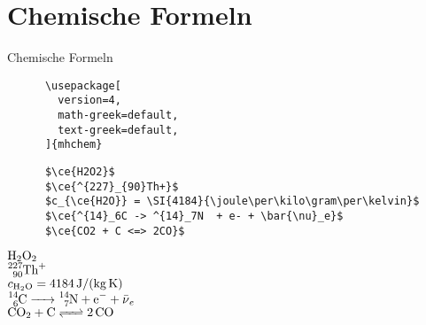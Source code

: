 \section{Chemische Formeln}
\begin{frame}[fragile]{Chemische Formeln}
  \begin{Packages}
    \begin{lstlisting}
      \usepackage[
        version=4,
        math-greek=default,
        text-greek=default,
      ]{mhchem}
    \end{lstlisting}
  \end{Packages}
  \begin{CodeExample}{0.51}
    \begin{lstlisting}
      $\ce{H2O2}$
      $\ce{^{227}_{90}Th+}$
      $c_{\ce{H2O}} = \SI{4184}{\joule\per\kilo\gram\per\kelvin}$
      $\ce{^{14}_6C -> ^{14}_7N  + e- + \bar{\nu}_e}$
      $\ce{CO2 + C <=> 2CO}$
    \end{lstlisting}
  \CodeResult
    \linespread{1.3}\selectfont
    $\ce{H2O2}$ \\
    $\ce{^{227}_{90}Th+}$ \\
    $c_{\ce{H2O}} = \SI{4184}{\joule\per\kilo\gram\per\kelvin}$ \\[0.3\baselineskip]
    $\ce{^{14}_6C -> ^{14}_7N  + e- + \bar{\nu}_e}$ \\[0.3\baselineskip]
    $\ce{CO2 + C <=> 2CO}$
  \end{CodeExample}
\end{frame}
